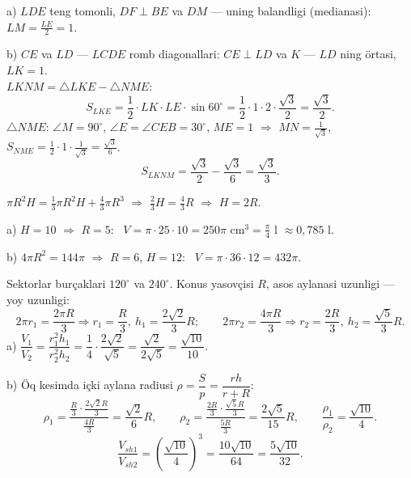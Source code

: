a) $LDE$ teng tomonli, $DF\perp BE$ va $DM$ — uning balandligi (medianasi): \ $LM=\frac{LE}2=1$.

b) $CE$ va $LD$ — $LCDE$ romb diagonallari: $CE\perp LD$ va $K$ — $LD$ ning örtasi, $LK=1$.\\
$LKNM=\triangle LKE-\triangle NME$:
\[S_{LKE}=\frac12\cdot LK\cdot LE\cdot\sin60^\circ=\frac12\cdot1\cdot2\cdot\frac{\sqrt3}2=\frac{\sqrt3}2.\]
$\triangle NME$: $\angle M=90^\circ$, $\angle E=\angle CEB=30^\circ$, $ME=1$ $\Rightarrow$ $MN=\frac1{\sqrt3}$, \ $S_{NME}=\frac12\cdot1\cdot\frac1{\sqrt3}=\frac{\sqrt3}6$.
\[S_{LKNM}=\frac{\sqrt3}2-\frac{\sqrt3}6=\frac{\sqrt3}3.\]

\newpage
{}
$\pi R^2H=\frac13\pi R^2H+\frac43\pi R^3$ $\Rightarrow$ $\frac23H=\frac43R$ $\Rightarrow$ $H=2R$.

a) $H=10$ $\Rightarrow$ $R=5$: \ $V=\pi\cdot25\cdot10=250\pi$ cm$^3=\frac\pi4$ l $\approx0{,}785$ l.

b) $4\pi R^2=144\pi$ $\Rightarrow$ $R=6$, $H=12$: \ $V=\pi\cdot36\cdot12=432\pi$.

\newpage
{}
Sektorlar burçaklari $120^\circ$ va $240^\circ$. Konus yasovçisi $R$, asos aylanasi uzunligi — yoy uzunligi:
\[2\pi r_1=\frac{2\pi R}3\Rightarrow r_1=\frac R3,\ h_1=\frac{2\sqrt2}3R;\qquad 2\pi r_2=\frac{4\pi R}3\Rightarrow r_2=\frac{2R}3,\ h_2=\frac{\sqrt5}3R.\]
a) $\dfrac{V_1}{V_2}=\dfrac{r_1^2h_1}{r_2^2h_2}=\dfrac14\cdot\dfrac{2\sqrt2}{\sqrt5}=\dfrac{\sqrt2}{2\sqrt5}=\dfrac{\sqrt{10}}{10}$.

b) Öq kesimda içki aylana radiusi $\rho=\dfrac{S}{p}=\dfrac{rh}{r+R}$:
\[\rho_1=\frac{\frac R3\cdot\frac{2\sqrt2R}3}{\frac{4R}3}=\frac{\sqrt2}6R,\qquad \rho_2=\frac{\frac{2R}3\cdot\frac{\sqrt5R}3}{\frac{5R}3}=\frac{2\sqrt5}{15}R,\qquad \frac{\rho_1}{\rho_2}=\frac{\sqrt{10}}4.\]
\[\frac{V_{sh1}}{V_{sh2}}=\left(\frac{\sqrt{10}}4\right)^3=\frac{10\sqrt{10}}{64}=\frac{5\sqrt{10}}{32}.\]

\ShowJavoblar

